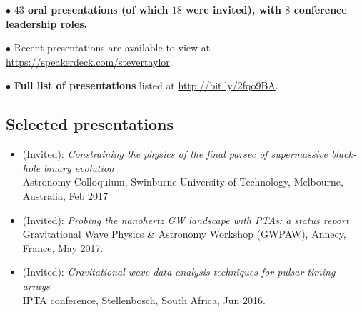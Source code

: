 \documentclass[11pt,letterpaper,sans]{moderncv}
\begin{document}
$\bullet$ \textbf{$43$ oral presentations (of which $18$ were invited), with $8$ conference leadership roles.}

$\bullet$ Recent presentations are available to view at {\color{color1} \href{https://speakerdeck.com/stevertaylor}{https://speakerdeck.com/stevertaylor}}.

$\bullet$ \textbf{Full list of presentations} listed at {\color{color1} \href{http://bit.ly/2fqo9BA}{http://bit.ly/2fqo9BA}}.

\subsection{Selected presentations}

\begin{itemize}[leftmargin=8mm]

\item (Invited): \textit{Constraining the physics of the final parsec of supermassive black-hole binary evolution} \\ Astronomy Colloquium, Swinburne University of Technology, Melbourne, Australia, Feb 2017

\item (Invited): \textit{Probing the nanohertz GW landscape with PTAs: a status report} \\ Gravitational Wave Physics \& Astronomy Workshop (GWPAW), Annecy, France, May 2017.

\item (Invited): \textit{Gravitational-wave data-analysis techniques for pulsar-timing arrays} \\ IPTA conference, Stellenbosch, South Africa, Jun 2016.

\end{itemize}
\end{document}
